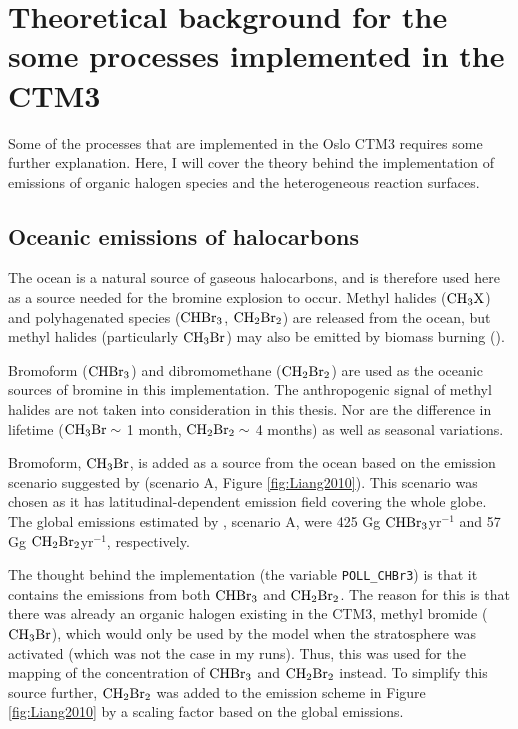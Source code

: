 \setcounter{chapter}{2} 
\chapter{Theoretical background for the some processes implemented in the CTM3}\label{Chap:CTM3theory_ocean_hetReact}

Some of the processes that are implemented in the Oslo CTM3 requires some further explanation. Here, I will cover the theory behind the implementation of emissions of organic halogen species and the heterogeneous reaction surfaces.

\section{Oceanic emissions of halocarbons}\label{sec:oceanic_emissions}


The ocean is a natural source of gaseous halocarbons, and is therefore used here as a source needed for the bromine explosion to occur. Methyl halides ($\mathrm{CH_3X}$) and polyhagenated species ($\mathrm{CHBr_3}$, $\mathrm{CH_2Br_2}$) are released from the ocean, but methyl halides (particularly $\mathrm{CH_3Br}$) may also be emitted by biomass burning (\cite{SeinfeldSpyros}). 

\medskip

Bromoform ($\mathrm{CHBr_3}$) and dibromomethane ($\mathrm{CH_2Br_2}$) are used as the oceanic sources of bromine in this implementation. The anthropogenic signal of methyl halides are not taken into consideration in this thesis. Nor are the difference in lifetime ($\mathrm{CH_3Br} \sim$ 1 month, $\mathrm{CH_2Br_2} \sim$ 4 months) as well as seasonal variations. 


\medskip

Bromoform, $\mathrm{CH_3Br}$, is added as a source from the ocean based on the emission scenario suggested by \cite{Liang2010} (scenario A, Figure \ref{fig:Liang2010}). This scenario was chosen as it has latitudinal-dependent emission field covering the whole globe. The global emissions estimated by \cite{Liang2010}, scenario A, were 425 Gg $\mathrm{CHBr_3}$yr$^{-1}$ and 57 Gg $\mathrm{CH_2Br_2}$yr$^{-1}$, respectively.

\medskip

The thought behind the implementation (the variable \texttt{POLL\_CHBr3}) is that it contains the emissions from both $\mathrm{CHBr_3}$ and $\mathrm{CH_2Br_2}$. The reason for this is that there was already an organic halogen existing in the CTM3, methyl bromide ($\mathrm{CH_3Br}$), which would only be used by the model when the stratosphere was activated (which was not the case in my runs). Thus, this was used for the mapping of the concentration of $\mathrm{CHBr_3}$ and $\mathrm{CH_2Br_2}$ instead. To simplify this source further, $\mathrm{CH_2Br_2}$ was added to the emission scheme in Figure \ref{fig:Liang2010} by a scaling factor based on the global emissions. 

